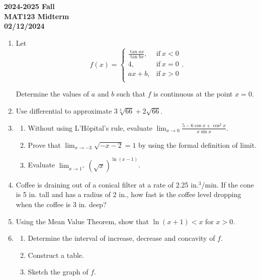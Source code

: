 \documentclass[a4paper, 12pt]{article}
\begin{document}
\pagestyle{empty}

\begin{center}
\textbf{2024-2025 Fall\\MAT123 Midterm\\02/12/2024}
\end{center}

\begin{enumerate}[leftmargin=*,label=\textbf{\arabic*.}]
\item Let
\[
f(x) =
\begin{cases}
\displaystyle \frac{\tan ax}{\tan bx}, & \text{if}\ x < 0 \\[1em]
4, & \text{if}\ x = 0 \\[1em]
ax+b, & \text{if}\ x >0 \\
\end{cases}.
\]

Determine the values of $a$ and $b$ such that $f$ is continuous at the point $x=0$.

\item Use differential to approximate $3\sqrt[3]{66}+2\sqrt{66}$.

\item
\begin{enumerate}[leftmargin=*,label=\textbf{\alph*.}]
\item Without using L'Hôpital's rule, evaluate $\displaystyle \lim_{x\to 0} \frac{5-6\cos x + \cos^2x}{x\sin x}$.

\item Prove that $\displaystyle \lim_{x\to -3} \sqrt{-x-2} = 1$ by using the formal definition of limit.

\item Evaluate $\displaystyle\lim_{x\to1^+}\left(\sqrt x\right)^{\ln(x-1)}$.
\end{enumerate}

\item Coffee is draining out of a conical filter at a rate of 2.25 in.$^3$/min. If the cone is 5 in. tall and has a radius of 2 in., how fast is the coffee level dropping when the coffee is 3 in. deep?

\item Using the Mean Value Theorem, show that $\ln(x+1) < x$ for $x > 0$.

\item
\begin{enumerate}[leftmargin=*,label=\textbf{\alph*.}]
\item Determine the interval of increase, decrease and concavity of $f$.
\item Construct a table.
\item Sketch the graph of $f$.
\end{enumerate}
\end{enumerate}
\end{document}
